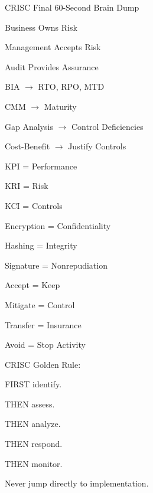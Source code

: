 \documentclass{beamer}
\begin{document}
	\begin{frame}[shrink=5]{CRISC Final 60-Second Brain Dump}
		\footnotesize
		
		Business Owns Risk
		
		Management Accepts Risk
		
		Audit Provides Assurance
		
		\medskip
		
		BIA $\rightarrow$ RTO, RPO, MTD
		
		CMM $\rightarrow$ Maturity
		
		Gap Analysis $\rightarrow$ Control Deficiencies
		
		Cost-Benefit $\rightarrow$ Justify Controls
		
		\medskip
		
		KPI = Performance
		
		KRI = Risk
		
		KCI = Controls
		
		\medskip
		
		Encryption = Confidentiality
		
		Hashing = Integrity
		
		Signature = Nonrepudiation
		
		\medskip
		
		Accept = Keep
		
		Mitigate = Control
		
		Transfer = Insurance
		
		Avoid = Stop Activity
		
		\medskip
		
		CRISC Golden Rule:
		
		FIRST identify.
		
		THEN assess.
		
		THEN analyze.
		
		THEN respond.
		
		THEN monitor.
		
		Never jump directly to implementation.
		
	\end{frame}
	
\end{document}

